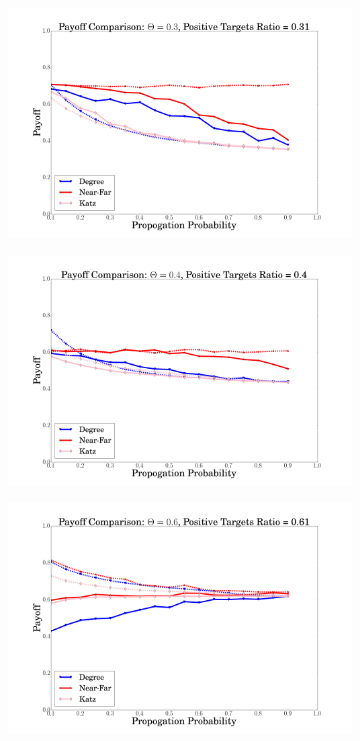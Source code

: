  \begin{figure}
  \begin{subfigure}{\linewidth}
  \includegraphics[width=1\textwidth]{../plots/comparison/theta=3.png}
  \end{subfigure}\par\medskip
  \begin{subfigure}{\linewidth}
\includegraphics[width=1\textwidth]{../plots/comparison/theta=4.png}
  \end{subfigure}\par\medskip
    \begin{subfigure}{\linewidth}
  \includegraphics[width=1\textwidth]{../plots/comparison/theta=6.png}

\end{subfigure}
\end{figure}
